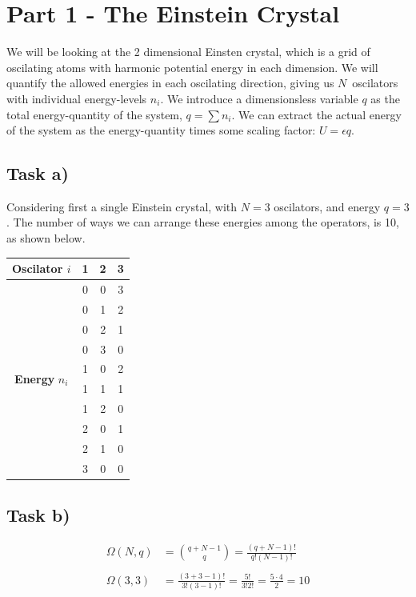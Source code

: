 \documentclass[12p,a4paper]{article}
\begin{document}
\section*{Part 1 - The Einstein Crystal}

We will be looking at the 2 dimensional Einsten crystal, which is a grid of oscilating atoms with harmonic potential energy in each dimension. We will quantify the allowed energies in each oscilating direction, giving us $N$ oscilators with individual energy-levels $n_i$. We introduce a dimensionsless variable $q$ as the total energy-quantity of the system, $q = \sum n_i$.  We can extract the actual energy of the system as the energy-quantity times some scaling factor: $U = \epsilon q$.

\subsection*{Task a)}
Considering first a single Einstein crystal, with $N = 3$ oscilators, and energy $q=3$. The number of ways we can arrange these energies among the operators, is 10, as shown below.

\begin{tabular}{c|c c c}
    \textbf{Oscilator} $i$	& \textbf{1} & \textbf{2} & \textbf{3}\\
    \hline
    \multirow{10}{*}{\textbf{Energy} $n_i$}
                    & 0 & 0 & 3\\
     				& 0 & 1 & 2\\
     				& 0 & 2 & 1\\
     				& 0 & 3 & 0\\
     				& 1 & 0 & 2\\
     				& 1 & 1 & 1\\
     				& 1 & 2 & 0\\
     				& 2 & 0 & 1\\
     				& 2 & 1 & 0\\
     				& 3 & 0 & 0\\
\end{tabular}




\subsection*{Task b)}

\begin{align*}
    \Omega(N, q) &= \binom{q + N - 1}{q} = \frac{(q+N-1)!}{q!(N-1)!} \\
    \\
    \Omega(3, 3) &= \frac{(3+3-1)!}{3!(3-1)!} = \frac{5!}{3!2!} = \frac{5\cdot 4}{2} = 10
\end{align*}
\end{document}
